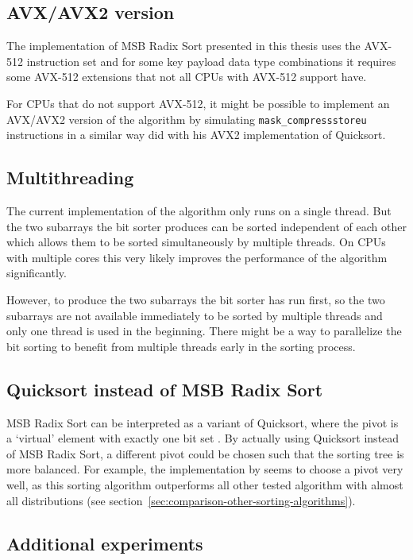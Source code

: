 \documentclass[12pt, a4paper, openright, twoside]{tiarbeit}
\begin{document}
\subsection{AVX/AVX2 version}

The implementation of MSB Radix Sort presented in this thesis uses
the AVX-512 instruction set and for some key payload data type
combinations it requires some AVX-512 extensions
that not all CPUs with AVX-512 support have.

For CPUs that do not support AVX-512, it might be possible to implement an
AVX/AVX2 version of the algorithm by simulating \texttt{mask\_compressstoreu}
instructions in a similar way \citet{blacher} did with his AVX2 implementation
of Quicksort.

\subsection{Multithreading}

The current implementation of the algorithm only runs on a single thread.
But the two subarrays the bit sorter produces can be sorted independent
of each other which allows them to be sorted simultaneously
by multiple threads. On CPUs with multiple cores this
very likely improves the performance of the algorithm significantly.

However, to produce the two subarrays the bit sorter has run first,
so the two subarrays are not available immediately to be sorted
by multiple threads and only one thread is used in the beginning.
There might be a way to parallelize the bit sorting to
benefit from multiple threads early in the sorting process.

\subsection{Quicksort instead of MSB Radix Sort}

MSB Radix Sort can be interpreted as a variant of Quicksort, where
the pivot is a `virtual' element with exactly one bit set
\citep[p. 128]{knuth_taocp}. By actually using Quicksort
instead of MSB Radix Sort, a different pivot could be chosen
such that the sorting tree is more balanced.
For example, the implementation by \citet{blacher} seems to
choose a pivot very well, as this sorting algorithm
outperforms all other tested algorithm with almost all
distributions (see section~\ref{sec:comparison-other-sorting-algorithms}).

\subsection{Additional experiments}
\end{document}
